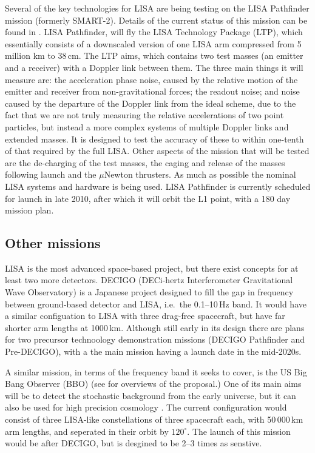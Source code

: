 \documentclass{article}
\begin{document}
Several of the key technologies for LISA are being testing on the LISA 
Pathfinder mission (formerly SMART-2). Details of the current status of this 
mission can be found in \cite{Armano:2009}. LISA Pathfinder, will fly the
LISA Technology Package (LTP), which essentially consists of a downscaled 
version of one LISA arm compressed from 5 million km to 38\,cm. The LTP aims, 
which contains two test masses (an emitter and a receiver) with a Doppler link
between them. The three main things it will measure are: the acceleration phase 
noise, caused by the relative motion of the emitter and receiver from 
non-gravitational forces; the readout noise; and noise caused by the departure 
of the Doppler link from the ideal scheme, due to the fact that we are not 
truly measuring the relative accelerations of two point particles, but instead 
a more complex systems of multiple Doppler links and extended masses. It is 
designed to test the accuracy of these to within one-tenth of that required by 
the full LISA. Other aspects of the mission that will be tested are the 
de-charging of the test masses, the caging and release of the masses following 
launch and the $\mu$Newton thrusters. As much as possible the nominal LISA 
systems and hardware is being used. LISA Pathfinder is currently scheduled for 
launch in late 2010, after which it will orbit the L1 point, with a 180 day
mission plan.

\subsection{Other missions}
LISA is the most advanced space-based project, but there exist concepts for at 
least two more detectors. DECIGO (DECi-hertz Interferometer Gravitational Wave 
Observatory) \cite{Sato:2009} is a Japanese project designed to fill the gap in 
frequency between ground-based detector and LISA, i.e.\ the 0.1--10\,Hz band. It
would have a similar configuation to LISA with three drag-free spacecraft, but 
have far shorter arm lengths at 1000\,km. Although still early in its design 
there are plans for two precursor technoology demonstration missions (DECIGO 
Pathfinder \cite{Ando:2009} and Pre-DECIGO), with a the main mission having a 
launch date in the mid-2020s.

A similar mission, in terms of the frequency band it seeks to cover, is the US 
Big Bang Observer (BBO) (see \cite{Crowder:2005, Cutler:2009, Harry:2006} for 
overviews of the proposal.) One of its main aims will be to detect the 
stochastic background from the early universe, but it can also be used for high
precision cosmology \cite{Cutler:2009}. The current configuration would consist 
of three LISA-like constellations of three spacecraft each, with 50\,000\,km arm
lengths, and seperated in their orbit by $120^{\circ}$. The launch of this 
mission would be after DECIGO, but is desgined to be 2--3 times as senstive. 
\end{document}
